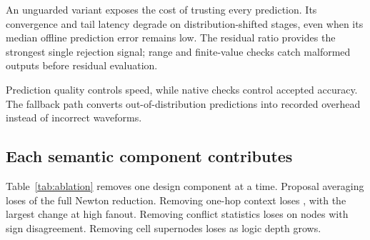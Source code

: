 An unguarded variant exposes the cost of trusting every prediction. Its convergence and tail latency degrade on distribution-shifted stages, even when its median offline prediction error remains low. The residual ratio provides the strongest single rejection signal; range and finite-value checks catch malformed outputs before residual evaluation.

\takeaway Prediction quality controls speed, while native checks control accepted accuracy. The fallback path converts out-of-distribution predictions into recorded overhead instead of incorrect waveforms.

\subsection{Each semantic component contributes}

Table~\ref{tab:ablation} removes one design component at a time. Proposal averaging loses \MeanAggregatorGain{} of the full Newton reduction. Removing one-hop context loses \OneHopGain{}, with the largest change at high fanout. Removing conflict statistics loses \ConflictGain{} on nodes with sign disagreement. Removing cell supernodes loses \SupernodeGain{} as logic depth grows.

\begin{table}[t]
\caption{\textbf{The aggregator and its semantic inputs each reduce Newton work.} Changes are relative to full \system{}.}
\label{tab:ablation}
\centering
\scriptsize
{}
\end{table}

